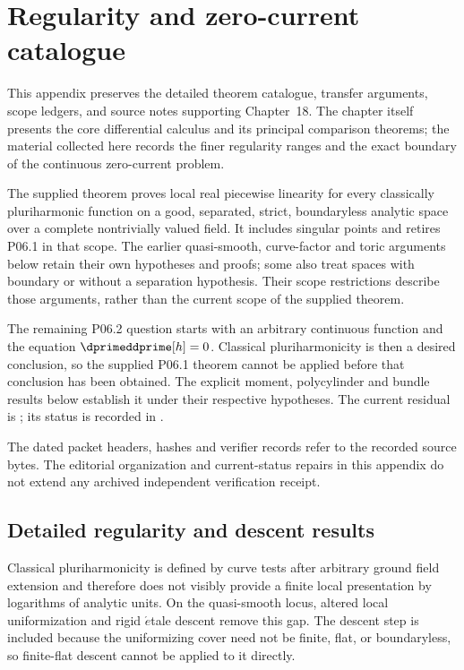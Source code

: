\chapter{Regularity and zero-current catalogue}
\label{app:ch18-frontiers}

This appendix preserves the detailed theorem catalogue, transfer arguments, scope ledgers, and source notes supporting Chapter~18.  The chapter itself presents the core differential calculus and its principal comparison theorems; the material collected here records the finer regularity ranges and the exact boundary of the continuous zero-current problem.

\begin{remark}
\label{rem:appM-current-regularity-boundary}
The supplied theorem  proves
local real piecewise linearity for every classically pluriharmonic function
on a good, separated, strict, boundaryless analytic space over a complete
nontrivially valued field. It includes singular points and retires P06.1 in
that scope. The earlier quasi-smooth, curve-factor and toric arguments below
retain their own hypotheses and proofs; some also treat spaces with boundary
or without a separation hypothesis. Their scope restrictions describe those
arguments, rather than the current scope of the supplied theorem.

The remaining P06.2 question starts with an arbitrary continuous function
and the equation \(\dprimeddprime[h]=0\). Classical pluriharmonicity is
then a desired conclusion, so the supplied P06.1 theorem cannot be applied
before that conclusion has been obtained. The explicit moment, polycylinder
and bundle results below establish it under their respective hypotheses.
The current residual is ; its status is
recorded in .

The dated packet headers, hashes and verifier records refer to the recorded
source bytes. The editorial organization and current-status repairs in this
appendix do not extend any archived independent verification receipt.
\end{remark}

\section{Detailed regularity and descent results}
\label{sec:appM-regularity-results}

Classical pluriharmonicity is defined by curve tests after arbitrary ground
field extension and therefore does not visibly provide a finite local
presentation by logarithms of analytic units.  On the quasi-smooth locus,
altered local uniformization and rigid \(\acute{e}\)tale descent remove this
gap.  The descent step is included because the uniformizing cover need not be
finite, flat, or boundaryless, so finite-flat descent cannot be applied to it
directly.

